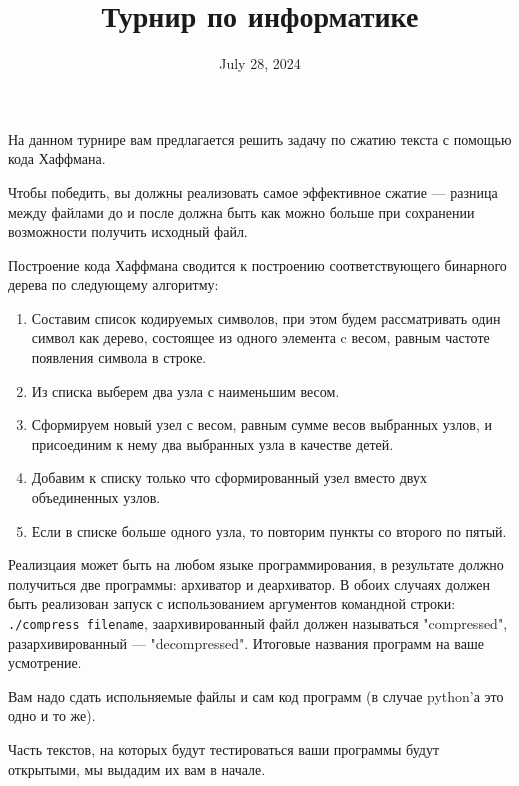 \documentclass[a4paper, 12pt]{article}
\title{Турнир по информатике}
\date{July 28, 2024}
\begin{document}
    \maketitle
    \thispagestyle{empty}
    На данном турнире вам предлагается решить задачу по сжатию текста с помощью кода Хаффмана.

    Чтобы победить, вы должны реализовать самое эффективное сжатие --- разница между файлами до и
    после должна быть как можно больше при сохранении возможности получить исходный файл.

    Построение кода Хаффмана сводится к построению соответствующего бинарного дерева по следующему алгоритму:
    \begin{enumerate}
        \item Составим список кодируемых символов, при этом будем рассматривать один символ как дерево, состоящее из одного элемента c весом, равным частоте появления символа в строке.
        \item Из списка выберем два узла с наименьшим весом.
        \item Сформируем новый узел с весом, равным сумме весов выбранных узлов, и присоединим к нему два выбранных узла в качестве детей.
        \item Добавим к списку только что сформированный узел вместо двух объединенных узлов.
        \item Если в списке больше одного узла, то повторим пункты со второго по пятый.
    \end{enumerate}

    Реализцаия может быть на любом языке программирования, в результате должно получиться две программы: архиватор и деархиватор.
    В обоих случаях должен быть реализован запуск с использованием аргументов командной строки: \verb|./compress filename|, заархивированный файл должен называться "compressed",
    разархивированный --- "decompressed". Итоговые названия программ на ваше усмотрение.

    Вам надо сдать испольняемые файлы и сам код программ (в случае python'а это одно и то же).

    Часть текстов, на которых будут тестироваться ваши программы будут открытыми, мы выдадим их вам в начале.
\end{document}
